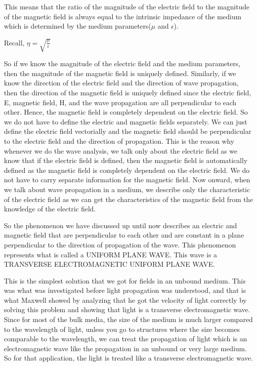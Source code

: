 This means that the ratio of the magnitude of the electric field to the magnitude of the magnetic field is always equal to the intrinsic impedance of the medium which is determined by the medium parameters($\mu$ and $\epsilon$).
\begin{center}
Recall, $\eta = \sqrt{\frac{\mu}{\epsilon}}$
\end{center}
So if we know the magnitude of the electric field and the medium parameters, then the magnitude of the magnetic field is uniquely defined. Similarly, if we know the direction of the electric field and the direction of wave propagation, then the direction of the magnetic field is uniquely defined since the electric field, E, magnetic field, H, and the wave propagation are all perpendicular to each other. 
Hence, the magnetic field is completely dependent on the electric field. So we do not have to define the electric and magnetic fields separately.
We can just define the electric field vectorially and the magnetic field should be perpendicular to the electric field and the direction of propagation. This is the reason why whenever we do the wave analysis, we talk only about the electric field as we know that if the electric field is defined, then the magnetic field is automatically defined as the magnetic field is completely dependent on the electric field. We do not have to carry separate information for the magnetic field. Now onward, when we talk about wave propagation in a medium, we describe only the characteristic of the electric field as we can get the characteristics of the magnetic field from the knowledge of the electric field.

So the phenomenon we have discussed up until now describes an electric and magnetic field that are perpendicular to each other and are constant in a plane perpendicular to the direction of propagation of the wave. This phenomenon represents what is called a UNIFORM PLANE WAVE. This wave is a TRANSVERSE ELECTROMAGNETIC UNIFORM PLANE WAVE.

This is the simplest solution that we got for fields in an unbound medium. This was what was investigated before light propagation was understood, and that is what Maxwell showed by analyzing that he got the velocity of light correctly by solving this problem and showing that light is a transverse electromagnetic wave. Since for most of the bulk media, the size of the medium is much larger compared to the wavelength of light, unless you go to structures where the size becomes comparable to the wavelength, we can treat the propagation of light which is an electromagnetic wave like the propagation in an unbound or very large medium. So for that application, the light is treated like a transverse electromagnetic wave. 

